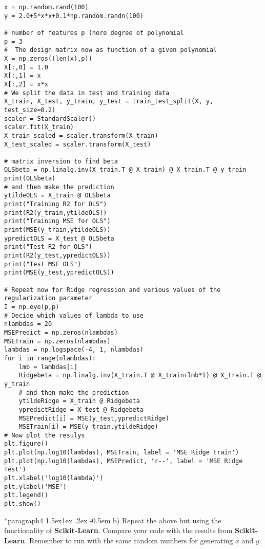 \documentclass[%
oneside,                 %
final,                   %
10pt]{article}
\makeatletter
\newenvironment{doconceexercise}{}{}
\newcommand\subex{\@startsection*{paragraph}{4}{\z@}%
                  {1.5ex\@plus1ex \@minus.2ex}%
                  {-0.5em}%
                  {\normalfont\normalsize\bfseries}}
\makeatother
\begin{document}
\begin{doconceexercise}
\begin{verbatim}
x = np.random.rand(100)
y = 2.0+5*x*x+0.1*np.random.randn(100)

# number of features p (here degree of polynomial
p = 3
#  The design matrix now as function of a given polynomial
X = np.zeros((len(x),p))
X[:,0] = 1.0
X[:,1] = x
X[:,2] = x*x
# We split the data in test and training data
X_train, X_test, y_train, y_test = train_test_split(X, y, test_size=0.2)
scaler = StandardScaler()
scaler.fit(X_train)
X_train_scaled = scaler.transform(X_train)
X_test_scaled = scaler.transform(X_test)

# matrix inversion to find beta
OLSbeta = np.linalg.inv(X_train.T @ X_train) @ X_train.T @ y_train
print(OLSbeta)
# and then make the prediction
ytildeOLS = X_train @ OLSbeta
print("Training R2 for OLS")
print(R2(y_train,ytildeOLS))
print("Training MSE for OLS")
print(MSE(y_train,ytildeOLS))
ypredictOLS = X_test @ OLSbeta
print("Test R2 for OLS")
print(R2(y_test,ypredictOLS))
print("Test MSE OLS")
print(MSE(y_test,ypredictOLS))

# Repeat now for Ridge regression and various values of the regularization parameter
I = np.eye(p,p)
# Decide which values of lambda to use
nlambdas = 20
MSEPredict = np.zeros(nlambdas)
MSETrain = np.zeros(nlambdas)
lambdas = np.logspace(-4, 1, nlambdas)
for i in range(nlambdas):
    lmb = lambdas[i]
    Ridgebeta = np.linalg.inv(X_train.T @ X_train+lmb*I) @ X_train.T @ y_train
    # and then make the prediction
    ytildeRidge = X_train @ Ridgebeta
    ypredictRidge = X_test @ Ridgebeta
    MSEPredict[i] = MSE(y_test,ypredictRidge)
    MSETrain[i] = MSE(y_train,ytildeRidge)
# Now plot the resulys
plt.figure()
plt.plot(np.log10(lambdas), MSETrain, label = 'MSE Ridge train')
plt.plot(np.log10(lambdas), MSEPredict, 'r--', label = 'MSE Ridge Test')
plt.xlabel('log10(lambda)')
plt.ylabel('MSE')
plt.legend()
plt.show()

\end{verbatim}



\subex{b)}
Repeat the above but using the functionality of \textbf{Scikit-Learn}. Compare your code with the results from \textbf{Scikit-Learn}. Remember to run with the same random numbers for generating $x$ and $y$.


\end{doconceexercise}
\end{document}
